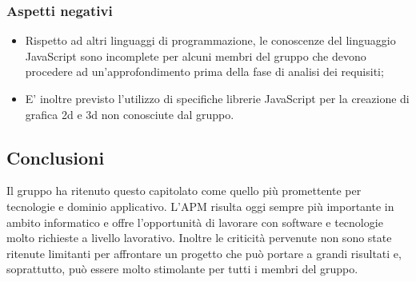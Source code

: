 		\subsubsection{Aspetti negativi}
			\begin{itemize}
				\item Rispetto ad altri linguaggi di programmazione, le conoscenze del linguaggio JavaScript sono incomplete per alcuni membri del gruppo che devono procedere ad un'approfondimento prima della fase di analisi dei requisiti;
				\item E' inoltre previsto l'utilizzo di specifiche librerie JavaScript per la creazione di grafica 2d e 3d non conosciute dal gruppo.
			\end{itemize}
	\subsection{Conclusioni}	
	Il gruppo ha ritenuto questo capitolato come quello più promettente per tecnologie e dominio applicativo. L'APM risulta oggi sempre più importante in ambito informatico e offre l'opportunità di lavorare con software e tecnologie molto richieste a livello lavorativo. Inoltre le criticità pervenute non sono state ritenute limitanti per affrontare un progetto che può portare a grandi risultati e, soprattutto, può essere molto stimolante per tutti i membri del gruppo.
			 